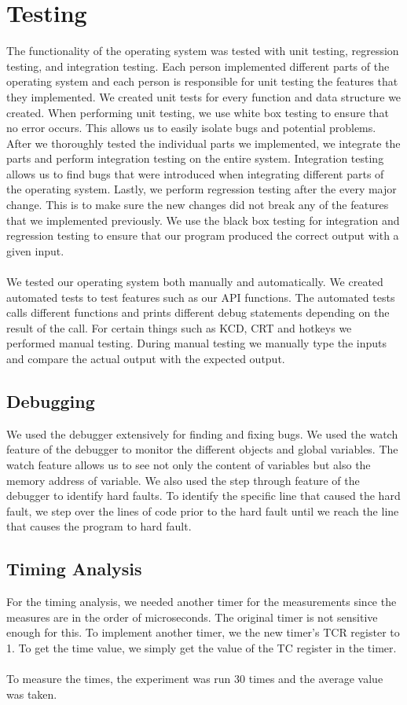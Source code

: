 \documentclass[12pt]{article}
\begin{document}
\section{Testing}
The functionality of the operating system was tested with unit testing, regression testing, and integration testing. Each person implemented different parts of the operating system and each person is responsible for unit testing the features that they implemented. We created unit tests for every function and data structure we created. When performing unit testing, we use white box testing to ensure that no error occurs. This allows us to easily isolate bugs and potential problems. After we thoroughly tested the individual parts we implemented, we integrate the parts and perform integration testing on the entire system. Integration testing allows us to find bugs that were introduced when integrating different parts of the operating system. Lastly, we perform regression testing after the every major change. This is to make sure the new changes did not break any of the features that we implemented previously. We use the black box testing for integration and regression testing to ensure that our program produced the correct output with a given input. \\ \\
We tested our operating system both manually and automatically. We created automated tests to test features such as our API functions. The automated tests calls different functions and prints different debug statements depending on the result of the call. For certain things such as KCD, CRT and hotkeys we performed manual testing. During manual testing we manually type the inputs and compare the actual output with the expected output.
\subsection{Debugging}
We used the debugger extensively for finding and fixing bugs. We used the watch feature of the debugger to monitor the different objects and global variables. The watch feature allows us to see not only the content of variables but also the memory address of variable. We also used the step through feature of the debugger to identify hard faults. To identify the specific line that caused the hard fault, we step over the lines of code prior to the hard fault until we reach the line that causes the program to hard fault.
\subsection{Timing Analysis}
For the timing analysis, we needed another timer for the measurements since the measures are in the order of microseconds. The original timer is not sensitive enough for this. To implement another timer, we the new timer’s TCR register to 1. To get the time value, we simply get the value of the TC register in the timer. \\ \\
To measure the times, the experiment was run 30 times and the average value was taken. 
\end{document}
